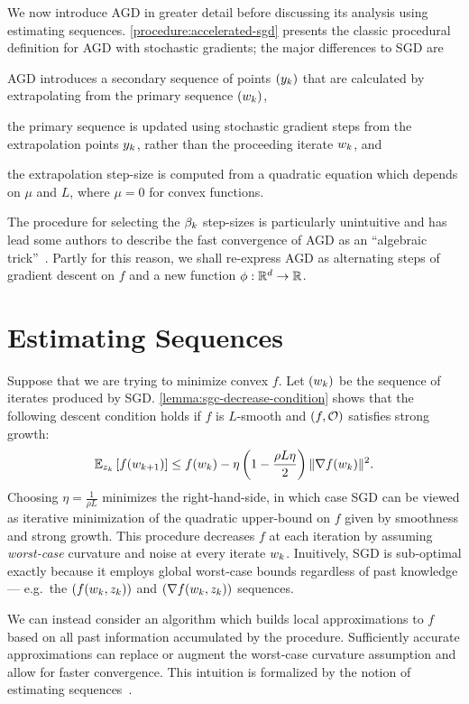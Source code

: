 We now introduce AGD in greater detail before discussing its analysis using estimating sequences. 
\autoref{procedure:accelerated-sgd} presents the classic procedural definition for AGD with stochastic gradients; the major differences to SGD are
\begin{inparaenum}[i)]
\item AGD introduces a secondary sequence of points \( \seq{\yk} \) that are calculated by extrapolating from the primary sequence \( \seq{\wk} \),
\item the primary sequence is updated using stochastic gradient steps from the extrapolation points \( \yk \), rather than the proceeding iterate \( \wk \), and 
\item the extrapolation step-size is computed from a quadratic equation which depends on \( \mu \) and \( L \), where \( \mu = 0 \) for convex functions. 
\end{inparaenum}
The procedure for selecting the \( \betak \) step-sizes is particularly unintuitive and has lead some authors to describe the fast convergence of AGD as an ``algebraic trick''~\citep{allen2014linear}.
Partly for this reason, we shall re-express AGD as alternating steps of gradient descent on \( f \) and a new function \( \phi : \R^d \rightarrow \R \).


\section{Estimating Sequences}\label{sec:estimating-sequences}


Suppose that we are trying to minimize convex \( f \).
Let \( \seq{\wk} \) be the sequence of iterates produced by SGD.\@
\autoref{lemma:sgc-decrease-condition} shows that the following descent condition holds if \( f \) is \( L \)-smooth and \( \rbr{f, \oracle{}} \) satisfies strong growth:
\[ \Ek\sbr{f(\wkk)} \leq f(\wk) - \eta \rbr{1 - \frac{\rho L \eta}{2}}\norm{\grad(\wk)}^2. \]
Choosing \( \eta = \frac{1}{\rho L} \) minimizes the right-hand-side, in which case SGD can be viewed as iterative minimization of the quadratic upper-bound on \( f \) given by smoothness and strong growth. 
This procedure decreases \( f \) at each iteration by assuming \emph{worst-case} curvature and noise at every iterate \( \wk \). 
Inuitively, SGD is sub-optimal exactly because it employs global worst-case bounds regardless of past knowledge --- e.g.\ the \( \seq{f(\wk, \zk)} \) and \( \seq{\grad(\wk, \zk)} \) sequences. 

We can instead consider an algorithm which builds local approximations to \( f \) based on all past information accumulated by the procedure.
Sufficiently accurate approximations can replace or augment the worst-case curvature assumption and allow for faster convergence. 
This intuition is formalized by the notion of estimating sequences~\citep{nesterov2004lectures}.

